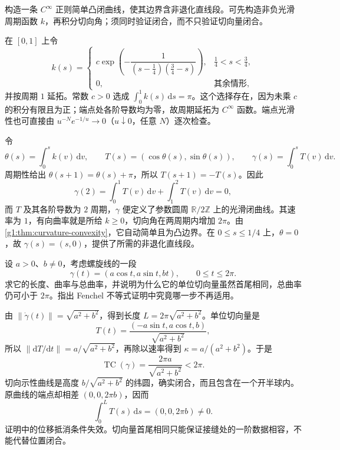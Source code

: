 \begin{exercise}\label{g1:ex:smooth-convex-flat-segment}
	构造一条 \(C^\infty\) 正则简单凸闭曲线，使其边界含非退化直线段。可先构造非负光滑周期函数 \(k\)，再积分切向角；须同时验证闭合，而不只验证切向量闭合。
\end{exercise}
\begin{solution}
	在 \([0,1]\) 上令
	\[
		k(s)=
		\begin{cases}
			c\exp\!\left(-\dfrac1{(s-\frac14)(\frac34-s)}\right),&\frac14<s<\frac34,\\
			0,&\text{其余情形},
		\end{cases}
	\]
	并按周期 \(1\) 延拓。常数 \(c>0\) 选成 \(\int_0^1k(s)\,\mathrm{d}s=\pi\)。这个选择存在，因为未乘 \(c\) 的积分有限且为正；端点处各阶导数均为零，故周期延拓为 \(C^\infty\) 函数。端点光滑性也可直接由 \(u^{-N}e^{-1/u}\to0\)（\(u\downarrow0\)，任意 \(N\)）逐次检查。

	令
	\[
		\theta(s)=\int_0^s k(v)\,\mathrm{d}v,\qquad
		T(s)=(\cos\theta(s),\sin\theta(s)),\qquad
		\gamma(s)=\int_0^sT(v)\,\mathrm{d}v.
	\]
	周期性给出 \(\theta(s+1)=\theta(s)+\pi\)，所以 \(T(s+1)=-T(s)\)。因此
	\[
		\gamma(2)=\int_0^1T(v)\,\mathrm{d}v+\int_1^2T(v)\,\mathrm{d}v=0,
	\]
	而 \(T\) 及其各阶导数为 \(2\) 周期，\(\gamma\) 便定义了参数圆周 \(\mathbb R/2\mathbb Z\) 上的光滑闭曲线。其速率为 \(1\)，有向曲率就是所给 \(k\geq0\)，切向角在两周期内增加 \(2\pi\)。由\cref{g1:thm:curvature-convexity}，它自动简单且为凸边界。在 \(0\leq s\leq1/4\) 上，\(\theta=0\)，故 \(\gamma(s)=(s,0)\)，提供了所需的非退化直线段。
\end{solution}

\begin{exercise}\label{g1:ex:helix-total-curvature}
	设 \(a>0\)、\(b\ne0\)，考虑螺旋线的一段
	\[
		\gamma(t)=(a\cos t,a\sin t,bt),\qquad 0\le t\le2\pi.
	\]
	求它的长度、曲率与总曲率，并说明为什么它的单位切向量虽然首尾相同，总曲率仍可小于 \(2\pi\)。指出 Fenchel 不等式证明中究竟哪一步不再适用。
\end{exercise}
\begin{solution}
	由 \(\|\dot\gamma(t)\|=\sqrt{a^2+b^2}\)，得到长度 \(L=2\pi\sqrt{a^2+b^2}\)。单位切向量是
	\[
		T(t)=\frac{(-a\sin t,a\cos t,b)}{\sqrt{a^2+b^2}},
	\]
	所以 \(\|\mathrm{d}T/\mathrm{d}t\|=a/\sqrt{a^2+b^2}\)，再除以速率得到 \(\kappa=a/(a^2+b^2)\)。于是
	\[
		\operatorname{TC}(\gamma)=\frac{2\pi a}{\sqrt{a^2+b^2}}<2\pi.
	\]
	切向示性曲线是高度 \(b/\sqrt{a^2+b^2}\) 的纬圆，确实闭合，而且包含在一个开半球内。原曲线的端点却相差 \((0,0,2\pi b)\)，因而
	\[
		\int_0^L T(s)\,\mathrm{d}s=(0,0,2\pi b)\ne0.
	\]
	证明中的位移抵消条件失效。切向量首尾相同只能保证接缝处的一阶数据相容，不能代替位置闭合。
\end{solution}


